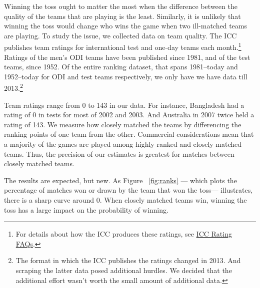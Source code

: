 \documentclass[12pt]{article}
\begin{document}
Winning the toss ought to matter the most when the difference between the quality of the teams that are playing is the least. Similarly, it is unlikely that winning the toss would change who wins the game when two ill-matched teams are playing. To study the issue, we collected data on team quality. The ICC publishes team ratings for international test and one-day teams each month.\footnote{For details about how the ICC produces these ratings, see \href{http://icc-live.s3.amazonaws.com/cms/media/about_docs/536b1a48c16e5-Reliance\%20ICC\%20ODI\%20Team\%20Rankings\%20FAQs\%202014.pdf}{ICC Rating FAQs}.} Ratings of the men's ODI teams have been published since 1981, and of the test teams, since 1952. Of the entire ranking dataset, that spans 1981--today and 1952--today for ODI and test teams respectively, we only have we have data till 2013.\footnote{The format in which the ICC publishes the ratings changed in 2013. And scraping the latter data posed additional hurdles. We decided that the additional effort wasn't worth the small amount of additional data.} 

Team ratings range from 0 to 143 in our data. For instance, Bangladesh had a rating of 0 in tests for most of 2002 and 2003. And Australia in 2007 twice held a rating of 143. We measure how closely matched the teams by differencing the ranking points of one team from the other. Commercial considerations mean that a majority of the games are played among highly ranked and closely matched teams. Thus, the precision of our estimates is greatest for matches between closely matched teams.

The results are expected, but new. As Figure ~\ref{fig:ranks} --- which plots the percentage of matches won or drawn by the team that won the toss--- illustrates, there is a sharp curve around 0. When closely matched teams win, winning the toss has a large impact on the probability of winning. 
\end{document}

